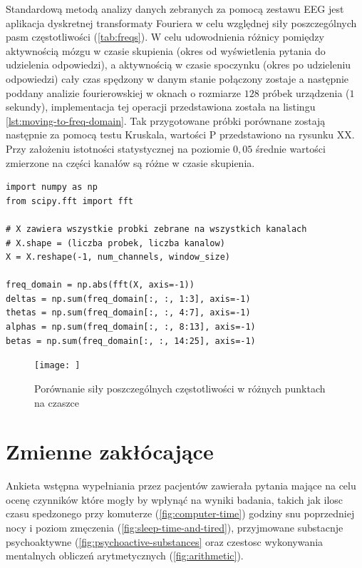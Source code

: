 \documentclass{./assets/wfis}
\begin{document}
Standardową metodą analizy danych zebranych za pomocą zestawu EEG jest aplikacja dyskretnej transformaty Fouriera w celu względnej siły poszczególnych pasm częstotliwości (\autoref{tab:freqs}). W celu udowodnienia różnicy pomiędzy aktywnością mózgu w czasie skupienia (okres od wyświetlenia pytania do udzielenia odpowiedzi), a aktywnością w czasie spoczynku (okres po udzieleniu odpowiedzi) cały czas spędzony w danym stanie połączony zostaje a następnie poddany analizie fourierowskiej w oknach o rozmiarze $128$ próbek urządzenia ($1$ sekundy), implementacja tej operacji przedstawiona została na listingu \ref{lst:moving-to-freq-domain}. Tak przygotowane próbki porównane zostają następnie za pomocą testu Kruskala, wartości P przedstawiono na rysunku XX. Przy założeniu istotności statystycznej na poziomie $0,05$ średnie wartości zmierzone na części kanałów są różne w czasie skupienia.


\begin{lstlisting}[caption={Przejście do domeny częstotliwościowej},label={lst:moving-to-freq-domain}]
import numpy as np
from scipy.fft import fft

# X zawiera wszystkie probki zebrane na wszystkich kanalach
# X.shape = (liczba probek, liczba kanalow)
X = X.reshape(-1, num_channels, window_size)

freq_domain = np.abs(fft(X, axis=-1))
deltas = np.sum(freq_domain[:, :, 1:3], axis=-1)
thetas = np.sum(freq_domain[:, :, 4:7], axis=-1)
alphas = np.sum(freq_domain[:, :, 8:13], axis=-1)
betas = np.sum(freq_domain[:, :, 14:25], axis=-1)
\end{lstlisting}


\begin{figure}[h!]
    \centering
    \texttt{[image: ]}
    \caption{Porównanie siły poszczególnych częstotliwości w różnych punktach na czaszce}
    \label{fig:brain-heatmaps}
\end{figure}

\section{Zmienne zakłócające}\label{zmiennne-zaklucajace}
Ankieta wstępna wypełniania przez pacjentów zawierała pytania mające na celu ocenę czynników które mogły by wpłynąć na wyniki badania, takich jak ilosc czasu spedzonego przy komuterze (\autoref{fig:computer-time}) godziny snu poprzedniej nocy i poziom zmęczenia (\autoref{fig:sleep-time-and-tired}), przyjmowane substacnje psychoaktywne (\autoref{fig:psychoactive-substances} oraz czestosc wykonywania mentalnych obliczeń arytmetycznych (\autoref{fig:arithmetic}).
\end{document}
